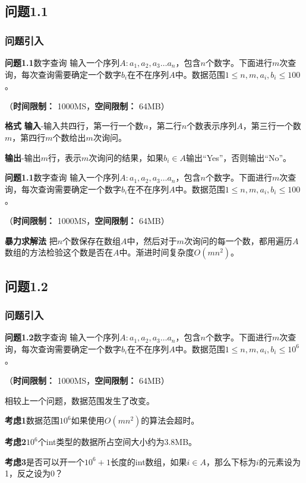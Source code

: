 \documentclass[11pt]{beamer}
\begin{document}
\subsection{问题1.1}
\begin{frame}[c]\frametitle{问题引入}
 {
	\begin{block}{{\textbf{问题1.1}\quad 数字查询}}
	输入一个序列$A: a_1, a_2, a_3\ldots a_n$，包含$n$个数字。下面进行$m$次查询，每次查询需要确定一个数字$b_i$在不在序列$A$中。数据范围$1 \leq n,m,a_i,b_i\leq 100$。

	（\textbf{时间限制：} 1000MS，\textbf{空间限制：} 64MB）
	\end{block}

	\begin{block}{\textbf{格式}}
	{\textbf{输入}}-输入共四行，第一行一个数$n$，第二行$n$个数表示序列$A$，第三行一个数$m$，第四行$m$个数给出$m$次询问。

	{\textbf{输出}}-输出$m$行，表示$m$次询问的结果，如果$b_{i}\in A$输出``Yes''，否则输出``No''。
	\end{block}
}
 {
	\begin{block}{{\textbf{问题1.1}\quad 数字查询}}
	输入一个序列$A: a_1, a_2, a_3\ldots a_n$，包含$n$个数字。下面进行$m$次查询，每次查询需要确定一个数字$b_i$在不在序列$A$中。数据范围$1 \leq n,m,a_i,b_i\leq 100$。

	（\textbf{时间限制：} 1000MS，\textbf{空间限制：} 64MB）
	\end{block}

	\textbf{暴力求解法} \quad 把$n$个数保存在数组$A$中，然后对于$m$次询问的每一个数，都用遍历$A$数组的方法检验这个数是否在$A$中。渐进时间复杂度$O(mn^2)$。

}
\end{frame}
\subsection{问题1.2}
\begin{frame}[c]\frametitle{问题引入}
	\begin{block}{{\textbf{问题1.2}\quad 数字查询}}
	输入一个序列$A: a_1, a_2, a_3\ldots a_n$，包含$n$个数字。下面进行$m$次查询，每次查询需要确定一个数字$b_i$在不在序列$A$中。数据范围$1 \leq n,m,a_i,b_i\leq 10^6$。

	（\textbf{时间限制：} 1000MS，\textbf{空间限制：} 64MB）
	\end{block}
	相较上一个问题，数据范围发生了改变。

	\textbf{考虑1}\quad 数据范围$10^6$如果使用$O(mn^2)$的算法会超时。


	\textbf{考虑2}\quad $10^6$个int类型的数据所占空间大小约为3.8MB。


	\textbf{考虑3}\quad 是否可以开一个$10^6+1$长度的int数组，如果$i\in A$，那么下标为$i$的元素设为1，反之设为0？
\end{frame}
\end{document}
